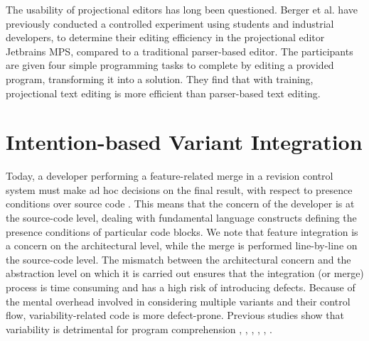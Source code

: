 The usability of projectional editors has long been questioned. Berger et al. \cite{berger2016mps} have previously conducted a controlled experiment using students and industrial developers, to determine their editing efficiency in the projectional editor Jetbrains MPS, compared to a traditional parser-based editor. The participants are given four simple programming tasks to complete by editing a provided program, transforming it into a solution. They find that with training, projectional text editing is more efficient than parser-based text editing.



\section{Intention-based Variant Integration}
Today, a developer performing a feature-related merge in a revision control system must make ad hoc decisions on the final result, with respect to presence conditions over source code \cite{stanciulescu2016concepts}. This means that the concern of the developer is at the source-code level, dealing with fundamental language constructs defining the presence conditions of particular code blocks. We note that feature integration is a concern on the architectural level, while the merge is performed line-by-line on the source-code level. The mismatch between the architectural concern and the abstraction level on which it is carried out ensures that the integration (or merge) process is time consuming and has a high risk of introducing defects. Because of the mental overhead involved in considering multiple variants and their control flow, variability-related code is more defect-prone. Previous studies show that variability is detrimental for program comprehension \cite{melo2016latin}, \cite{favre1997understanding}, \cite{ernst2002preprocessor}, \cite{abal2014variability}, \cite{medeiros2015preprocessor}, \cite{medeiros2013syntaxerrors}.


